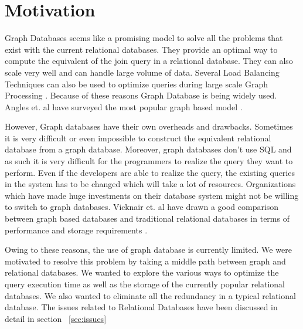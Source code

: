 \documentclass[12pt, oneside]{book}
\begin{document}
\section{Motivation}
Graph Databases seems like a promising model to solve all the problems that exist with the current relational databases. They provide an optimal way to compute the equivalent of the join query in a relational database. They can also scale very well and can handle large volume of data. Several Load Balancing Techniques can also be used to optimize queries during large scale Graph Processing \cite{load_balancing}. Because of these reasons Graph Database is being widely used. Angles et. al have surveyed the most popular graph based model \cite{graph_database_survey}. \\ \par
However, Graph databases have their own overheads and drawbacks. Sometimes it is very difficult or even impossible to construct the equivalent relational database from a graph database. Moreover, graph databases don't use SQL and as such it is very difficult for the programmers to realize the query they want to perform. Even if the developers are able to realize the query, the existing queries in the system has to be changed which will take a lot of resources. Organizations which have made huge investments on their database system might not be willing to switch to graph databases. Vicknair et. al have drawn a good comparison between graph based databases and traditional relational databases in terms of performance and storage requirements \cite{graph_relational_comparison}. \\ \par
Owing to these reasons, the use of graph database is currently limited. We were motivated to resolve this problem by taking a middle path between graph and relational databases. We wanted to explore the various ways to optimize the query execution time as well as the storage of the currently popular relational databases. We also wanted to eliminate all the redundancy in a typical relational database. The issues related to Relational Databases have been discussed in detail in section ~\ref{sec:issues}
\end{document}
